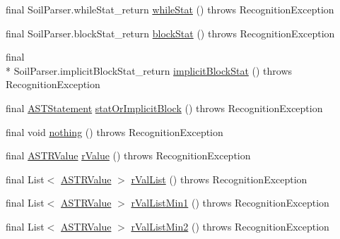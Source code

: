 \begin{DoxyCompactItemize}
\item 
final Soil\-Parser.\-while\-Stat\-\_\-return \hyperlink{classorg_1_1tzi_1_1use_1_1parser_1_1soil_1_1_soil_parser_aaae88e83933fcd0a45995f73ce03c2cb}{while\-Stat} ()  throws Recognition\-Exception 
\item 
final Soil\-Parser.\-block\-Stat\-\_\-return \hyperlink{classorg_1_1tzi_1_1use_1_1parser_1_1soil_1_1_soil_parser_a1af59d1c72c0fedf069472520dc249e7}{block\-Stat} ()  throws Recognition\-Exception 
\item 
final \\*
Soil\-Parser.\-implicit\-Block\-Stat\-\_\-return \hyperlink{classorg_1_1tzi_1_1use_1_1parser_1_1soil_1_1_soil_parser_ab34d0475aa13d3a4969d79c8024c3f87}{implicit\-Block\-Stat} ()  throws Recognition\-Exception 
\item 
final \hyperlink{classorg_1_1tzi_1_1use_1_1parser_1_1soil_1_1ast_1_1_a_s_t_statement}{A\-S\-T\-Statement} \hyperlink{classorg_1_1tzi_1_1use_1_1parser_1_1soil_1_1_soil_parser_a3b275450753a6951eb43991367fdae03}{stat\-Or\-Implicit\-Block} ()  throws Recognition\-Exception 
\item 
final void \hyperlink{classorg_1_1tzi_1_1use_1_1parser_1_1soil_1_1_soil_parser_ac74b52a2e68f1de0c241e775a905b36b}{nothing} ()  throws Recognition\-Exception 
\item 
final \hyperlink{classorg_1_1tzi_1_1use_1_1parser_1_1soil_1_1ast_1_1_a_s_t_r_value}{A\-S\-T\-R\-Value} \hyperlink{classorg_1_1tzi_1_1use_1_1parser_1_1soil_1_1_soil_parser_aa816a6f675e451ae7fc28128c0168bc7}{r\-Value} ()  throws Recognition\-Exception 
\item 
final List$<$ \hyperlink{classorg_1_1tzi_1_1use_1_1parser_1_1soil_1_1ast_1_1_a_s_t_r_value}{A\-S\-T\-R\-Value} $>$ \hyperlink{classorg_1_1tzi_1_1use_1_1parser_1_1soil_1_1_soil_parser_ad18803eff807b9d6dc8d528923c8214c}{r\-Val\-List} ()  throws Recognition\-Exception 
\item 
final List$<$ \hyperlink{classorg_1_1tzi_1_1use_1_1parser_1_1soil_1_1ast_1_1_a_s_t_r_value}{A\-S\-T\-R\-Value} $>$ \hyperlink{classorg_1_1tzi_1_1use_1_1parser_1_1soil_1_1_soil_parser_afdb900a4ee53666f95a09db675c4def3}{r\-Val\-List\-Min1} ()  throws Recognition\-Exception 
\item 
final List$<$ \hyperlink{classorg_1_1tzi_1_1use_1_1parser_1_1soil_1_1ast_1_1_a_s_t_r_value}{A\-S\-T\-R\-Value} $>$ \hyperlink{classorg_1_1tzi_1_1use_1_1parser_1_1soil_1_1_soil_parser_ad0744c0ea280463de2146a32599ef4e9}{r\-Val\-List\-Min2} ()  throws Recognition\-Exception 
\item 

\end{DoxyCompactItemize}

